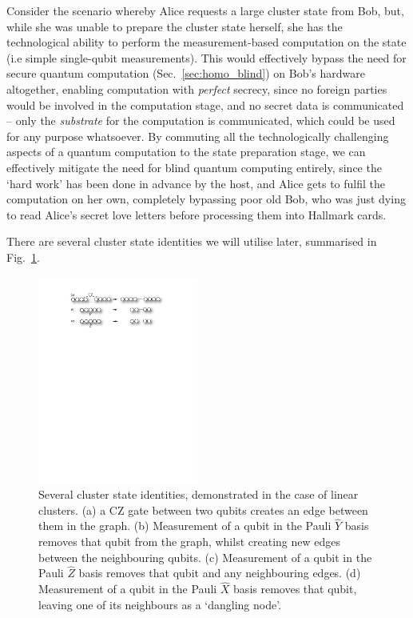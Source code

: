 Consider the scenario whereby Alice requests a large cluster state from Bob, but, while she was unable to prepare the cluster state herself, she has the technological ability to perform the measurement-based computation on the state (i.e simple single-qubit measurements). This would effectively bypass the need for secure quantum computation (Sec.~\ref{sec:homo_blind}) on Bob's hardware altogether, enabling computation with \textit{perfect} secrecy, since no foreign parties would be involved in the computation stage, and no secret data is communicated -- only the \textit{substrate} for the computation is communicated, which could be used for any purpose whatsoever. By commuting all the technologically challenging aspects of a quantum computation to the state preparation stage, we can effectively mitigate the need for blind quantum computing entirely, since the `hard work' has been done in advance by the host, and Alice gets to fulfil the computation on her own, completely bypassing poor old Bob, who was just dying to read Alice's secret love letters before processing them into Hallmark cards.

There are several cluster state identities we will utilise later, summarised in Fig.~\ref{fig:cluster_ident}.

\begin{figure}[!htb]
	\includegraphics[width=0.47\textwidth]{cluster_identities} 
	\caption{Several cluster state identities, demonstrated in the case of linear clusters. (a) a CZ gate between two qubits creates an edge between them in the graph. (b) Measurement of a qubit in the Pauli $\hat{Y}$ basis removes that qubit from the graph, whilst creating new edges between the neighbouring qubits. (c) Measurement of a qubit in the Pauli $\hat{Z}$ basis removes that qubit and any neighbouring edges. (d) Measurement of a qubit in the Pauli $\hat{X}$ basis removes that qubit, leaving one of its neighbours as a `dangling node'.} \label{fig:cluster_ident} 
\end{figure}

